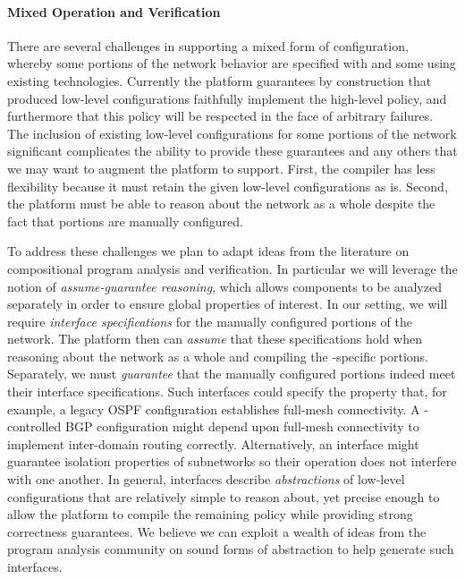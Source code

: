 \paragraph{Mixed Operation and Verification} There are several challenges in supporting a mixed form of configuration, whereby some portions of the network behavior are specified with \Name and some using existing technologies.  Currently the \Propane platform guarantees by construction that produced low-level configurations faithfully implement the high-level policy, and furthermore that this policy will be respected in the face of arbitrary failures.  The inclusion of existing low-level configurations for some portions of the network significant complicates the ability to provide these guarantees and any others that we may want to augment the platform to support. First, the \Name compiler has less flexibility because it must retain the given low-level configurations as is.  Second, the \Name platform must be able to reason about the network as a whole despite the fact that portions are manually configured.

To address these challenges we plan to adapt ideas from the literature on compositional program analysis and verification.  In particular we will leverage the notion of {\em assume-guarantee reasoning}, which allows components to be analyzed separately in order to ensure global properties of interest.  In our setting, we will require {\em interface specifications} for the manually configured portions of the network. 
The \Name platform then can {\em assume} that these specifications hold when reasoning about the network as a whole and compiling the \Name-specific portions.  Separately, we must {\em guarantee} that the manually configured portions indeed meet their interface specifications.
Such interfaces could specify the property that, for example, a legacy OSPF configuration establishes full-mesh connectivity.  A
\Name-controlled BGP configuration might depend upon full-mesh connectivity to implement inter-domain routing correctly.
Alternatively, an interface might guarantee isolation properties of subnetworks so their
operation does not interfere with one another. In general, interfaces 
describe {\em abstractions} of low-level configurations that are relatively simple to reason about, yet precise enough to allow the platform to compile the remaining \Name policy while providing strong correctness guarantees.
We believe we can exploit a wealth of ideas from the program analysis community on sound forms of abstraction
to help generate such interfaces. 

